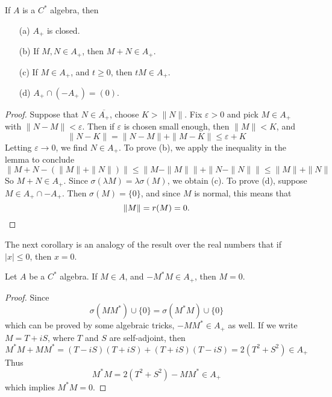 \begin{prop}
    If $A$ is a $C^*$ algebra, then
    \begin{enumerate}
        \item[(a)] $A_+$ is closed.
        \item[(b)] If $M,N \in A_+$, then $M + N \in A_+$.
        \item[(c)] If $M \in A_+$, and $t \geq 0$, then $tM \in A_+$.
        \item[(d)] $A_+ \cap (-A_+) = (0)$.
    \end{enumerate}
\end{prop}
\begin{proof}
    Suppose that $N \in \overline{A_+}$, choose $K > \| N \|$. Fix $\varepsilon > 0$ and pick $M \in A_+$ with $\| N - M \| < \varepsilon$. Then if $\varepsilon$ is chosen small enough, then $\| M \| < K$, and
    \[ \| N - K \| = \| N - M \| + \| M - K \| \leq \varepsilon + K \]
    Letting $\varepsilon \to 0$, we find $N \in A_+$. To prove (b), we apply the inequality in the lemma to conclude
    \[ \| M + N - (\| M \| + \| N \| ) \| \leq \| M - \| M \| \| + \| N - \| N \| \| \leq \| M \| + \| N \| \]
    So $M + N \in A_+$. Since $\sigma(\lambda M) = \lambda \sigma(M)$, we obtain (c). To prove (d), suppose $M \in A_+ \cap -A_+$. Then $\sigma(M) = \{ 0 \}$, and since $M$ is normal, this means that
    \[ \| M \| = r(M) = 0. \qedhere \]
\end{proof}

The next corollary is an analogy of the result over the real numbers that if $|x| \leq 0$, then $x = 0$.

\begin{lemma}
    Let $A$ be a $C^*$ algebra. If $M \in A$, and $-M^*M \in A_+$, then $M = 0$.
\end{lemma}
\begin{proof}
    Since
    \[ \sigma(MM^*) \cup \{ 0 \} = \sigma(M^*M) \cup \{ 0 \} \]
    which can be proved by some algebraic tricks, $-MM^* \in A_+$ as well. If we write $M = T + iS$, where $T$ and $S$ are self-adjoint, then
    \[ M^*M + MM^* = (T - iS)(T + iS) + (T + iS)(T - iS) = 2(T^2 + S^2) \in A_+ \]
    Thus
    \[ M^*M = 2(T^2 + S^2) - MM^* \in A_+ \]
    which implies $M^*M = 0$.
\end{proof}

